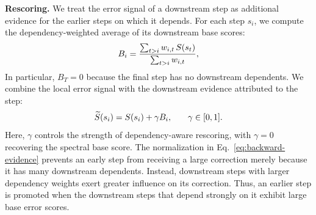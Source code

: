 





\textbf{Rescoring.} We treat the error signal of a downstream step as additional evidence for
the earlier steps on which it depends.
For each step $s_i$, we compute the dependency-weighted average of its downstream base
scores:
\begin{equation}
\small
    B_i
    =
        \frac{
            \sum_{t>i}
            w_{i,t}\,S(s_t)
        }{
           \sum_{t>i}w_{i,t}
        },
    \label{eq:backward-evidence}
\end{equation}
In particular, $B_T=0$ because the final step has no downstream dependents. We combine the local error signal with the downstream evidence attributed to
the step:
\begin{equation}
\small
    \widetilde{S}(s_i)
    =
    S(s_i)
    +
    \gamma B_i,
    \qquad
    \gamma\in[0,1].
    \label{eq:recap}
\end{equation}
Here, $\gamma$ controls the strength of dependency-aware rescoring, with
$\gamma=0$ recovering the spectral base score. The normalization in Eq.~\ref{eq:backward-evidence} prevents an early step
from receiving a large correction merely because it has many downstream
dependents.
Instead, downstream steps with larger dependency weights exert greater
influence on its correction.
Thus, an earlier step is promoted when the downstream steps that depend
strongly on it exhibit large base error scores.

